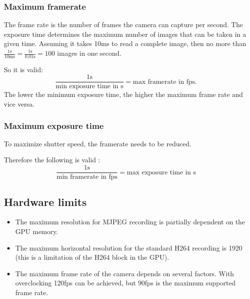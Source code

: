\documentclass[12pt, a4paper]{report}
\begin{document}
    \subsubsection{Maximum framerate}
    
    The frame rate is the number of frames the camera can capture per second. The exposure time determines the maximum number of images that can be taken in a given time. Assuming it takes 10ms to read a complete image, then no more than $\frac{1 \text{s} }{10 \text{ms}} = \frac{1\text{s}}{0.01\text{s}} = 100 $ images in one second. 
    
    \bigskip
    
    So it is valid: 
    \begin{displaymath}
    \frac{1\text{s}}{\text{min exposure time in s}} = \text{max framerate in
    fps.} 
    \end{displaymath}
    The lower the minimum exposure time, the higher the maximum frame rate and vice versa.
    
    \subsubsection{Maximum exposure time}
    To maximize shutter speed, the framerate needs to be reduced. 
       \newline
      
        \bigskip
    Therefore the following is valid :
    \begin{displaymath}
    \frac{1\text{s}}{\text{min framerate in fps}} = \text{max exposure time
    in s}
    \end{displaymath} 
    
    \subsection{Hardware limits}
    
    \begin{itemize}
    \item The maximum resolution for MJPEG recording is partially dependent on the GPU memory.
    \item The maximum horizontal resolution for the standard H264 recording is 1920 (this is a limitation of the H264 block in the GPU).
    \item The maximum frame rate of the camera depends on several factors. With overclocking 120fps can be achieved, but 90fps is the maximum supported frame rate.
    
    \end{itemize}
    
\end{document}
